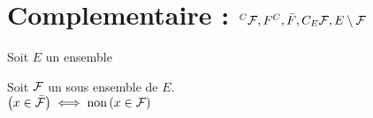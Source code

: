 \documentclass[12pt,twoside,a4paper]{article}
\author{MPSI 2}
\begin{document}
	\maketitle
	\section{Complementaire : $^C\mathcal{F},F^C,\bar{F},C_E\mathcal{F},E\setminus\mathcal{F}$}
		Soit $E$ un ensemble
		\begin{defi}
			Soit $\mathcal{F}$ un sous ensemble de $E$.\\
			$\left(x\in\bar{\mathcal{F}}\right)\iff\text{non}\left(x\in\mathcal{F}\right)$
		\end{defi}
\end{document}
